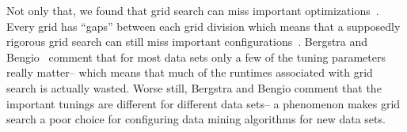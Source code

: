 \documentclass[final,twocolumn,5p]{elsarticle}
\begin{document}
Not only that, we found that grid search can miss
important optimizations~\cite{baker07}.
Every grid has ``gaps'' between each grid division which means
that a supposedly rigorous grid search can still miss
important configurations~\cite{Bergstra2012}. 
Bergstra and Bengio~\cite{Bergstra2012} comment that for most data sets only a few of the tuning parameters really matter-- which means that
much of the runtimes associated with grid search is actually wasted.
Worse still, Bergstra and Bengio  comment that 
the 
important tunings are   different   for different
data sets-- a 
 phenomenon makes grid search a poor choice for configuring data mining
 algorithms for new data sets. 
 



 






\end{document}
